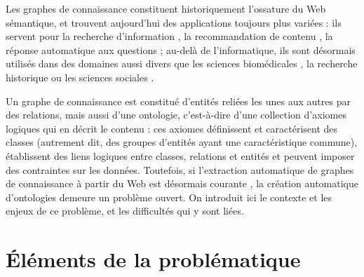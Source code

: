 \label{sec:Introduction}  %

Les graphes de connaissance constituent historiquement l'ossature du Web sémantique, et trouvent aujourd'hui des applications toujours plus variées : ils servent pour la recherche d'information \cite{bounhas2019building, dietz2018utilizing}, la recommandation de contenu \cite{ying2018graph, wang2018ripplenet, wang2019explainable}, la réponse automatique aux questions \cite{zhang2018variational, lukovnikov2017neural, saha2018complex}; %
au-delà de l'informatique, ils sont désormais utilisés dans des domaines aussi divers que les sciences biomédicales \cite{bakal2018exploiting, sousa2020evolving}, la recherche historique \cite{hyvonen2019knowledge, wilcke2017user} ou les sciences sociales \cite{heling2019building}.

%
Un graphe de connaissance est constitué d'entités reliées les unes aux autres par des relations, mais aussi d'une ontologie, c'est-à-dire d'une collection d'axiomes logiques qui en décrit le contenu : ces axiomes définissent et caractérisent des classes (autrement dit, des groupes d'entités ayant une caractéristique commune),  établissent des liens logiques entre classes, relations et entités et peuvent imposer des contraintes sur les données. Toutefois, si l'extraction automatique de graphes de connaissance à partir du Web est désormais courante \cite{auer2007dbpedia}, la création automatique d'ontologies demeure un problème ouvert. On introduit ici le contexte et les enjeux de ce problème, et les difficultés qui y sont liées.


\section{Éléments de la problématique}  %



